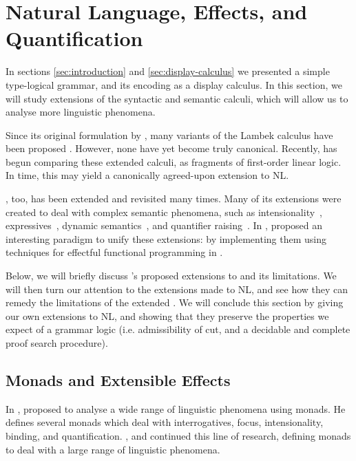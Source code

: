 \section{Natural Language, Effects, and Quantification}

In sections \autoref{sec:introduction} and
\autoref{sec:display-calculus} we presented a simple type-logical
grammar, and its encoding as a display calculus. In this section, we
will study extensions of the syntactic and semantic calculi, which
will allow us to analyse more linguistic phenomena.

Since its original formulation by \citet{lambek1961}, many variants of
the Lambek calculus have been proposed
\citep{steedman1988,moortgat2012,morrill2011,kubota2012,barker2015}.
However, none have yet become truly canonical.
Recently, \citet{moot2015} has begun comparing these extended calculi,
as fragments of first-order linear logic. In time, this may yield a
canonically agreed-upon extension to NL.

\lamET, too, has been extended and revisited many times. Many of its
extensions were created to deal with complex semantic phenomena, such
as intensionality~\citep{winter2009},
expressives~\citep{potts2003,mccready2010,gutzmann2011}, dynamic
semantics~\citep{groenendijk1995}, and quantifier
raising~\citep{barker2015}. 
In \citeyear{shan2002}, \citeauthor{shan2002} proposed an interesting
paradigm to unify these extensions: by implementing them using
techniques for effectful functional programming in \lamET.

Below, we will briefly discuss \citeauthor{shan2002}'s proposed
extensions to \lamET and its limitations. We will then turn our
attention to the extensions made to NL, and see how they can remedy
the limitations of the extended \lamET. We will conclude this section
by giving our own extensions to NL, and showing that they preserve the
properties we expect of a grammar logic (i.e. admissibility of cut,
and a decidable and complete proof search procedure).

\subsection{Monads and Extensible Effects}
In \citeyear{shan2002}, \citeauthor{shan2002} proposed to analyse a
wide range of linguistic phenomena using monads. He defines several
monads which deal with interrogatives, focus, intensionality, binding,
and quantification. \citet{bumford2013}, \citet{charlow2014} and
\citet{barker2015} continued this line of research, defining monads to
deal with a large range of linguistic phenomena.

